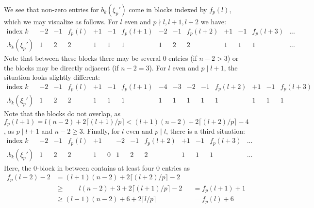 \documentclass[a4paper,12pt,bibliography=totocnumbered,titlepage=false,abstracton,bookmarksnumbered=true]{scrartcl}
\theoremstyle{definition}
\begin{document}
We see that non-zero entries for $b_k(\xi_p')$ come in blocks indexed by $f_p(l)$, which we may visualize as follows. For $l$ even and $p\nmid l, l{+}1, l{+}2$ we have:
\[
 \begin{array}{c|cccc||cc||cccc||cc|c}
  \scriptstyle \text{index } k  & \scriptstyle -2 &\scriptstyle -1 & \scriptstyle f_p(l) & \scriptstyle  +1  & \scriptstyle -1 & \scriptstyle f_p(l+1)  & \scriptstyle -2 & \scriptstyle -1 & \scriptstyle f_p(l+2) & \scriptstyle +1 & \scriptstyle -1 & \scriptstyle f_p(l+3) & \scriptstyle ... \\\hline
  \Big.b_k(\xi_p') & 1 & 2 & 2 & 1 & 1 & 1 & 1 & 2 & 2 & 1 & 1 & 1 &... 
 \end{array}
 \]
 Note that between these blocks there may be several 0 entries (if $n{-}2>3$) or the blocks may be directly adjacent (if $n{-}2=3$). For $l$ even and $p\mid l{+}1$, the situation looks slightly different:
\[
 \begin{array}{c|cccc||cc||cccccc||cc}
  \scriptstyle \text{index } k  & \scriptstyle -2 &\scriptstyle -1 & \scriptstyle f_p(l) & \scriptstyle  +1  & \scriptstyle -1 & \scriptstyle f_p(l+1)  & \scriptstyle -4 & \scriptstyle -3 & \scriptstyle -2 & \scriptstyle -1 & \scriptstyle f_p(l+2) & \scriptstyle +1 & \scriptstyle -1 & \scriptstyle f_p(l+3)  \\\hline
  \Big.b_k(\xi_p') & 1 & 2 & 2 & 1 & 1 & 1 & 1 & 1 & 1 & 1 & 1 & 1 & 1 & 1  
 \end{array}
 \]
Note that the blocks do not overlap, as $f_p(l{+}1)=l(n{-}2)+2\lceil (l{+}1)/p\rceil<(l{+}1)(n{-}2)+2\lceil(l{+}2)/p\rceil-4$, as $p\mid l{+}1$ and $n{-}2\geq 3$. Finally, for $l$ even and $p\mid l$, there is a third situation:
\begin{equation}\label{indextable}
 \begin{array}{c|cccc||c||cccc||cc|c}
  \scriptstyle \text{index } k  & \scriptstyle -2 &\scriptstyle -1 & \scriptstyle f_p(l) & \scriptstyle  +1  &  & \scriptstyle -2 & \scriptstyle -1 & \scriptstyle f_p(l+2) & \scriptstyle +1 & \scriptstyle -1 & \scriptstyle f_p(l+3) & \scriptstyle ... \\\hline
  \Big.b_k(\xi_p') & 1 & 2 & 2 & 1 & 0 & 1 & 2 & 2 & 1 & 1 & 1 &... 
 \end{array}
 \end{equation}
 Here, the $0$-block in between contains at least four $0$ entries as
 \begin{equation}\begin{aligned}\label{indextableindex}
  f_p(l{+}2)-2&=(l{+}1)(n{-}2)+2\big\lceil(l{+}2)/p\big\rceil-2\\
  &\geq\phantom{+1))}l(n{-}2)+3+2\big\lceil(l{+}1)/p\big\rceil-2 &&= f_p(l{+}1)+1\\
  &\geq(l{-}1)(n{-}2)+6+2\big\lceil l/p\big\rceil\phantom{-2} &&= f_p(l)+6\end{aligned}
 \end{equation}
\end{document}
